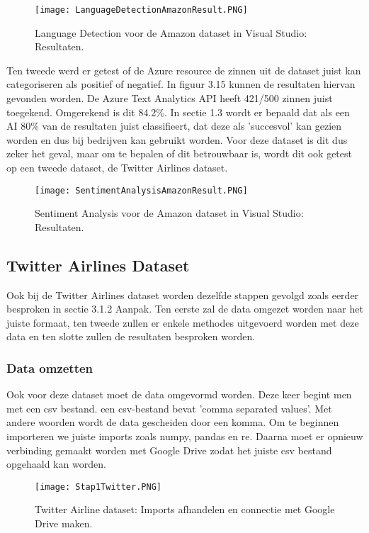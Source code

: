\begin{figure}[!htbp]
    \texttt{[image: LanguageDetectionAmazonResult.PNG]}
    \caption{\label{azurelanguagedetectionamazonresults}Language Detection voor de Amazon dataset in Visual Studio: Resultaten.}
\end{figure}
\FloatBarrier 

Ten tweede werd er getest of de Azure resource de zinnen uit de dataset juist kan categoriseren als positief of negatief. In figuur 3.15 kunnen de resultaten hiervan gevonden worden. De Azure Text Analytics API heeft 421/500 zinnen juist toegekend. Omgerekend is dit 84.2\%. In sectie 1.3 wordt er bepaald dat als een AI 80\% van de resultaten juist classifieert, dat deze als 'succesvol' kan gezien worden en dus bij bedrijven kan gebruikt worden. Voor deze dataset is dit dus zeker het geval, maar om te bepalen of dit betrouwbaar is, wordt dit ook getest op een tweede dataset, de Twitter Airlines dataset. 

\begin{figure}[!htbp]
    \texttt{[image: SentimentAnalysisAmazonResult.PNG]}
    \caption{\label{azuresentimentanalysisamazonresults}Sentiment Analysis voor de Amazon dataset in Visual Studio: Resultaten.}
\end{figure}
\FloatBarrier 

\subsection{Twitter Airlines Dataset}
\label{twitterdatasetazure}

Ook bij de Twitter Airlines dataset worden dezelfde stappen gevolgd zoals eerder besproken in sectie 3.1.2 Aanpak. Ten eerste zal de data omgezet worden naar het juiste formaat, ten tweede zullen er enkele methodes uitgevoerd worden met deze data en ten slotte zullen de resultaten besproken worden. 

\subsubsection{Data omzetten}
\label{twitterdatasetomzettenazure}
Ook voor deze dataset moet de data omgevormd worden. Deze keer begint men met een csv bestand. een csv-bestand bevat 'comma separated values'. Met andere woorden wordt de data gescheiden door een komma. Om te beginnen importeren we juiste imports zoals numpy, pandas en re. Daarna moet er opnieuw verbinding gemaakt worden met Google Drive zodat het juiste csv bestand opgehaald kan worden. 
\begin{figure}[!htbp]
    \texttt{[image: Stap1Twitter.PNG]}
    \caption{\label{azurestap1twitter}Twitter Airline dataset: Imports afhandelen en connectie met Google Drive maken.}
\end{figure}
\FloatBarrier 

